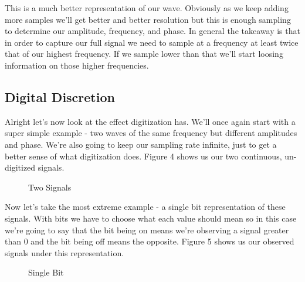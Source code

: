 \documentclass[10pt,a5paper]{book}
\begin{document}
This is a much better representation of our wave. Obviously as we keep adding more samples we'll get better and better resolution but this is enough sampling to determine our amplitude, frequency, and phase. In general the takeaway is that in order to capture our full signal we need to sample at a frequency at least twice that of our highest frequency. If we sample lower than that we'll start loosing information on those higher frequencies. 

\subsection{Digital Discretion}
Alright let's now look at the effect digitization has. We'll once again start with a super simple example - two waves of the same frequency but different amplitudes and phase. We're also going to keep our sampling rate infinite, just to get a better sense of what digitization does. Figure 4 shows us our two continuous, un-digitized signals. 

\begin{figure}[!htb]
\caption{\label{fig:my-label} Two Signals}
\end{figure}

Now let's take the most extreme example - a single bit representation of these signals. With bits we have to choose what each value should mean so in this case we're going to say that the bit being on means we're observing a signal greater than 0 and the bit being off means the opposite. Figure 5 shows us our observed signals under this representation. 

\begin{figure}[!htb]
\caption{\label{fig:my-label} Single Bit}
\end{figure}
\end{document}
